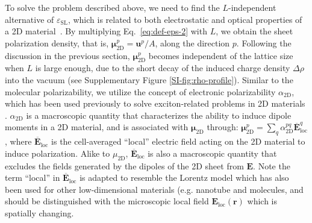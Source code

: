 \documentclass[journal=ancac3,manuscript=article,email=true,hyperref=true,keywords=false]{achemso}
\begin{document}
To solve the problem described above, we need to find the
$L$-independent alternative of $\varepsilon_{\mathrm{SL}}$, which is
related to both electrostatic and optical properties of a 2D
material~\cite{Matthes_2016}. By multiplying Eq.~\ref{eq:def-eps-2}
with $L$, we obtain the sheet polarization density, that is,
$\boldsymbol{\mu}_{\mathrm{2D}}^{p} =\boldsymbol{u}^{p}/A$, along the
direction $p$. Following the discussion in the previous section,
$\boldsymbol{\mu}_{\mathrm{2D}}^{p}$ becomes independent of the
lattice size when $L$ is large enough, due to the short decay of the 
induced charge density $\Delta \rho$ into the vacuum (see
Supplementary Figure \ref{SI-fig:rho-profile}).
%
Similar to the molecular polarizability\cite{Israelachvili_2011}, we
utilize the concept of electronic polarizability
$\alpha_{\mathrm{2D}}$, 
which has been used previously to solve
exciton-related problems in 2D materials
\cite{Cudazzo_2011_screening_2D,Olsen_2016_hydrogen,Jiang_2017_Eg_Eb}. 
%
$\alpha_{\mathrm{2D}}$ is a macroscopic quantity that characterizes
the ability to induce dipole moments in a 2D material, and is
associated with $\boldsymbol{\mu}_{\mathrm{2D}}$ through:
$\boldsymbol{\mu}_{\mathrm{2D}}^{p} = \sum_{q}
\alpha_{\mathrm{2D}}^{pq} \boldsymbol{\overline{E}}_{\mathrm{loc}}^{q}$\cite{T_bik_2004}, where
$\boldsymbol{\overline{E}}_{\mathrm{loc}}$ is the cell-averaged
``local'' electric field acting on the 2D material to induce
polarization\cite{Wiser_1963}.
% 
Alike to $\mu_{\mathrm{2D}}$,
$\boldsymbol{\overline{E}}_{\mathrm{loc}}$ is also a macroscopic
quantity that excludes the fields generated by the dipoles of the 2D
sheet from $\boldsymbol{E}$. Note the term ``local'' in
$\boldsymbol{\overline{E}}_{\mathrm{loc}}$ is adapted to resemble the
Lorentz model\cite{Wiser_1963} which has also been used for other
low-dimensional materials (e.g. nanotube\cite{Benedict_1995} and
molecules\cite{T_bik_2004}, and should be distinguished with the
microscopic local field $\boldsymbol{E}_{\mathrm{loc}}(\boldsymbol{r})$ which is spatially
changing.
%
\end{document}
